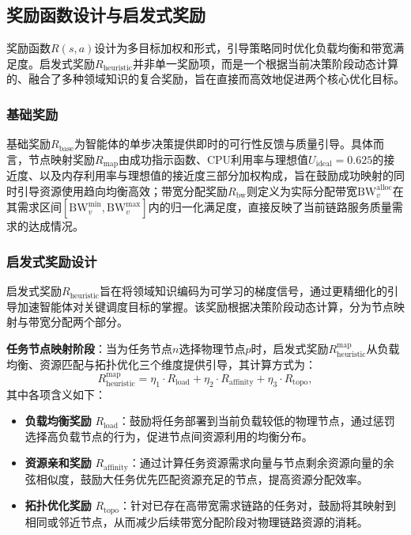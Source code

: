 \subsection{奖励函数设计与启发式奖励}
奖励函数$R(s,a)$设计为多目标加权和形式，引导策略同时优化负载均衡和带宽满足度。启发式奖励$R_{\text{heuristic}}$并非单一奖励项，而是一个根据当前决策阶段动态计算的、融合了多种领域知识的复合奖励，旨在直接而高效地促进两个核心优化目标。

\subsubsection{基础奖励}
基础奖励$R_{\text{base}}$为智能体的单步决策提供即时的可行性反馈与质量引导。具体而言，节点映射奖励$R_{\text{map}}$由成功指示函数、CPU利用率与理想值$U_{\text{ideal}}=0.625$的接近度、以及内存利用率与理想值的接近度三部分加权构成，旨在鼓励成功映射的同时引导资源使用趋向均衡高效；带宽分配奖励$R_{\text{bw}}$则定义为实际分配带宽$\text{BW}_v^{\text{alloc}}$在其需求区间$[\text{BW}_v^{\min}, \text{BW}_v^{\max}]$内的归一化满足度，直接反映了当前链路服务质量需求的达成情况。

\subsubsection{启发式奖励设计}
启发式奖励$R_{\text{heuristic}}$旨在将领域知识编码为可学习的梯度信号，通过更精细化的引导加速智能体对关键调度目标的掌握。该奖励根据决策阶段动态计算，分为节点映射与带宽分配两个部分。

\textbf{任务节点映射阶段}：当为任务节点$n$选择物理节点$p$时，启发式奖励$R_{\text{heuristic}}^{\text{map}}$从负载均衡、资源匹配与拓扑优化三个维度提供引导，其计算方式为：
\begin{equation}
R_{\text{heuristic}}^{\text{map}} = \eta_1 \cdot R_{\text{load}} + \eta_2 \cdot R_{\text{affinity}} + \eta_3 \cdot R_{\text{topo}},
\end{equation}
其中各项含义如下：
\begin{itemize}
    \item \textbf{负载均衡奖励} $R_{\text{load}}$：鼓励将任务部署到当前负载较低的物理节点，通过惩罚选择高负载节点的行为，促进节点间资源利用的均衡分布。
    \item \textbf{资源亲和奖励} $R_{\text{affinity}}$：通过计算任务资源需求向量与节点剩余资源向量的余弦相似度，鼓励大任务优先匹配资源充足的节点，提高资源分配效率。
    \item \textbf{拓扑优化奖励} $R_{\text{topo}}$：针对已存在高带宽需求链路的任务对，鼓励将其映射到相同或邻近节点，从而减少后续带宽分配阶段对物理链路资源的消耗。
\end{itemize}

